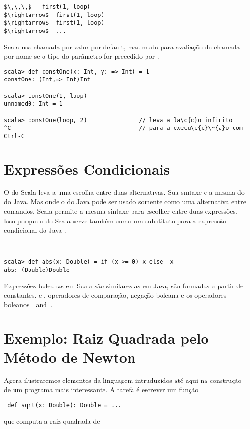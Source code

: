 \begin{lstlisting}
$\,\,\,$   first(1, loop)
$\rightarrow$  first(1, loop)
$\rightarrow$  first(1, loop)
$\rightarrow$  ...
\end{lstlisting}

Scala usa chamada por valor por default, mas muda para avalia\c{c}\~{a}o de chamada por nome 
se o tipo do par\^{a}metro for precedido por \code{=>}. 
\example\ 
 
\begin{lstlisting}
scala> def constOne(x: Int, y: => Int) = 1
constOne: (Int,=> Int)Int

scala> constOne(1, loop)
unnamed0: Int = 1

scala> constOne(loop, 2)               // leva a la\c{c}o infinito
^C                                     // para a execu\c{c}\~{a}o com Ctrl-C
\end{lstlisting}

\section{Express\~{o}es Condicionais}
O  do Scala leva a uma escolha entre duas alternativas. Sua
sintaxe \'{e} a mesma do  do Java. Mas onde o  do 
Java pode ser usado somente como uma alternativa entre comandos, Scala 
permite a mesma sintaxe para escolher entre duas express\~{o}es. Isso porque o
 do Scala serve tamb\'{e}m como um substituto para a express\~{a}o 
condicional do Java .      

\example\
\begin{lstlisting}
scala> def abs(x: Double) = if (x >= 0) x else -x
abs: (Double)Double
\end{lstlisting}
Express\~{o}es boleanas em Scala s\~{a}o similares as em Java; s\~{a}o formadas
a partir de constantes.  
 e
, operadores de compara\c{c}\~{a}o, nega\c{c}\~{a}o boleana \code{!} e os 
operadores boleanos  $\,$\code{&&}$\,$ and $\,$\code{||}. 

\section{\label{sec:sqrt}Exemplo: Raiz Quadrada pelo M\'{e}todo de Newton}
Agora ilustraremos elementos da linguagem intruduzidos at\'{e} aqui na
constru\c{c}\~{a}o de um programa mais interessante. A tarefa \'{e} escrever um fun\c{c}\~{a}o  
 \begin{lstlisting}
 def sqrt(x: Double): Double = ...
 \end{lstlisting}
que computa a raiz quadrada de . 

